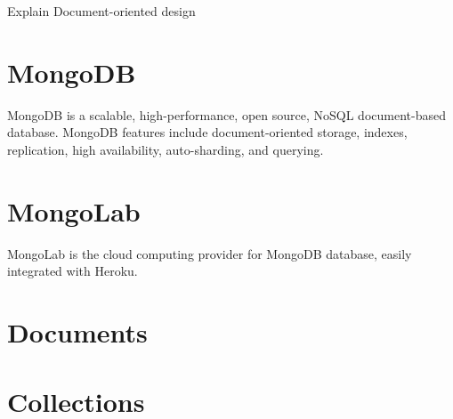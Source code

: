 
Explain Document-oriented design 

\section{MongoDB}
 MongoDB is a scalable, high-performance, open source, NoSQL document-based database. MongoDB features include document-oriented storage, indexes, replication, high availability, auto-sharding, and querying.

\section{MongoLab}
MongoLab is the cloud computing provider for MongoDB database, easily integrated with Heroku.

\section{Documents}

\section{Collections}


